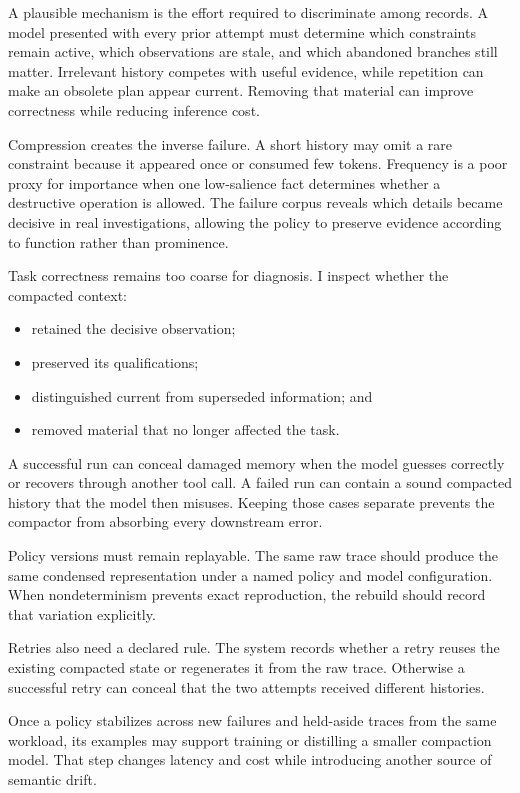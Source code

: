 A plausible mechanism is the effort required to discriminate among records. A model presented with every prior attempt must determine which constraints remain active, which observations are stale, and which abandoned branches still matter. Irrelevant history competes with useful evidence, while repetition can make an obsolete plan appear current. Removing that material can improve correctness while reducing inference cost.

Compression creates the inverse failure. A short history may omit a rare constraint because it appeared once or consumed few tokens. Frequency is a poor proxy for importance when one low-salience fact determines whether a destructive operation is allowed. The failure corpus reveals which details became decisive in real investigations, allowing the policy to preserve evidence according to function rather than prominence.


Task correctness remains too coarse for diagnosis. I inspect whether the compacted context:

\begin{itemize}
\tightlist
\item
  retained the decisive observation;
\item
  preserved its qualifications;
\item
  distinguished current from superseded information; and
\item
  removed material that no longer affected the task.
\end{itemize}

A successful run can conceal damaged memory when the model guesses correctly or recovers through another tool call. A failed run can contain a sound compacted history that the model then misuses. Keeping those cases separate prevents the compactor from absorbing every downstream error.

Policy versions must remain replayable. The same raw trace should produce the same condensed representation under a named policy and model configuration. When nondeterminism prevents exact reproduction, the rebuild should record that variation explicitly.

Retries also need a declared rule. The system records whether a retry reuses the existing compacted state or regenerates it from the raw trace. Otherwise a successful retry can conceal that the two attempts received different histories.

Once a policy stabilizes across new failures and held-aside traces from the same workload, its examples may support training or distilling a smaller compaction model. That step changes latency and cost while introducing another source of semantic drift.

